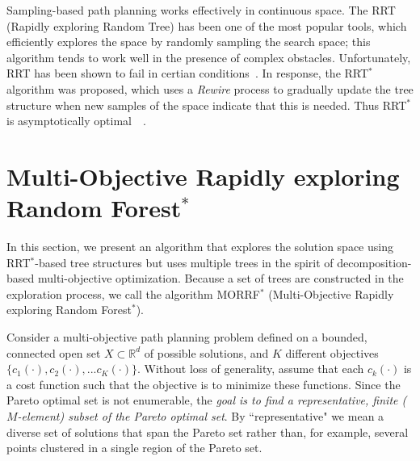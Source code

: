 \documentclass{article}
\begin{document}
Sampling-based path planning works effectively in continuous space. 
The RRT (Rapidly exploring Random Tree) has been one of the most popular tools, which  efficiently explores the space by randomly sampling the search space; this algorithm tends to work well in the presence of complex obstacles.
Unfortunately, RRT has been shown to fail in certian conditions~\cite{Karaman.Frazzoli:RSS10}. 
In response, the RRT$^{*}$ algorithm was proposed, which uses a \emph{Rewire} process to gradually update the tree structure when new samples of the space indicate that this is needed. Thus RRT$^{*}$ is asymptotically
optimal~\cite{Karaman.Frazzoli:RSS10}~\cite{Karaman:2011:SAO:2000201.2000209}. 

\section{Multi-Objective Rapidly exploring Random Forest$^{*}$}
\label{sec:morrt}

In this section, we present an algorithm that explores the solution space using RRT$^{*}$-based tree structures but uses multiple trees in the spirit of decomposition-based multi-objective optimization.
Because a set of trees are constructed in the exploration process, we call the algorithm MORRF$^{*}$ (Multi-Objective Rapidly exploring Random Forest$^{*}$).

Consider a multi-objective path planning problem defined on a bounded, connected open set $X\subset\mathbb{R}^d$ of possible solutions, and $K$ different objectives $\{c_{1}(\cdot), c_{2}(\cdot), ... c_{K}(\cdot)\}$. 
Without loss of generality, assume that each $c_{k}(\cdot)$ is a cost function such that the objective is to minimize these functions.  
Since the Pareto optimal set is not enumerable, the {\em goal is to find a representative, finite ($M$-element) subset of the Pareto optimal set}.  
By ``representative" we mean a diverse set of solutions that span the Pareto set rather than, for example, several points clustered in a single region of the Pareto set.  
\end{document}
